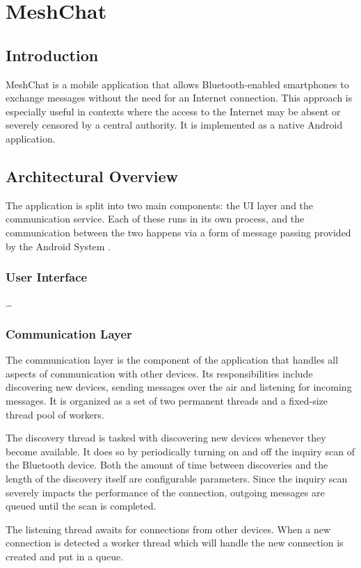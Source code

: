 \chapter{MeshChat}

\section{Introduction}
MeshChat is a mobile application that allows Bluetooth-enabled smartphones to exchange messages without the need for an Internet connection.
This approach is especially useful in contexts where the access to the Internet may be absent or severely censored by a central authority.
It is implemented as a native Android application.

\section{Architectural Overview}
The application is split into two main components: the UI layer and the communication service.
Each of these runs in its own process, and the communication between the two happens via a form of message passing provided by the Android System \cite{android_message}.

\subsection{User Interface}
\dots

\subsection{Communication Layer}
The communication layer is the component of the application that handles all aspects of communication with other devices.
Its responsibilities include discovering new devices, sending messages over the air and listening for incoming messages.
It is organized as a set of two permanent threads and a fixed-size thread pool of workers.

The discovery thread is tasked with discovering new devices whenever they become available.
It does so by periodically turning on and off the inquiry scan of the Bluetooth device.
Both the amount of time between discoveries and the length of the discovery itself are configurable parameters.
Since the inquiry scan severely impacts the performance of the connection, outgoing messages are queued until the scan is completed.

The listening thread awaits for connections from other devices. When a new connection is detected a worker thread which will handle the new connection is created and put in a queue.


